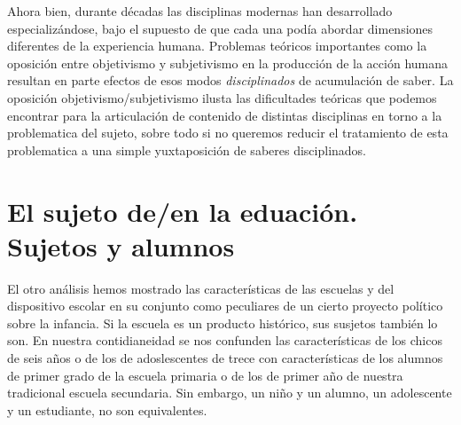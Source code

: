 \documentclass[a4paper,12pt,spanish]{book}
\begin{document}
 Ahora bien, durante décadas las disciplinas modernas han desarrollado especializándose, bajo el supuesto de que cada una podía abordar dimensiones 
 diferentes de la experiencia humana. Problemas teóricos importantes como la oposición entre objetivismo y subjetivismo en la producción 
 de la acción humana resultan en parte efectos de esos modos \textit{disciplinados} de acumulación de saber.
 La oposición objetivismo/subjetivismo ilusta las dificultades teóricas que podemos encontrar para la articulación de contenido de distintas 
 disciplinas en torno a la problematica del sujeto, sobre todo si no queremos reducir el tratamiento de esta problematica a una simple yuxtaposición 
 de saberes disciplinados.

 \section {El sujeto de/en la eduación. Sujetos y alumnos}

 El otro análisis \citep{baqueroyterigi1996} hemos mostrado las características de las escuelas y del dispositivo escolar en su conjunto como 
 peculiares de un cierto proyecto político sobre la infancia. Si la escuela es un producto histórico, sus susjetos también lo son. En nuestra 
 contidianeidad se nos confunden las características de los chicos de seis años o de los de adoslescentes de trece con características de los 
 alumnos de primer grado de la escuela primaria o de los de primer año de nuestra tradicional escuela secundaria. Sin embargo, un niño y un 
 alumno, un adolescente y un estudiante, no son equivalentes.
\end{document}

